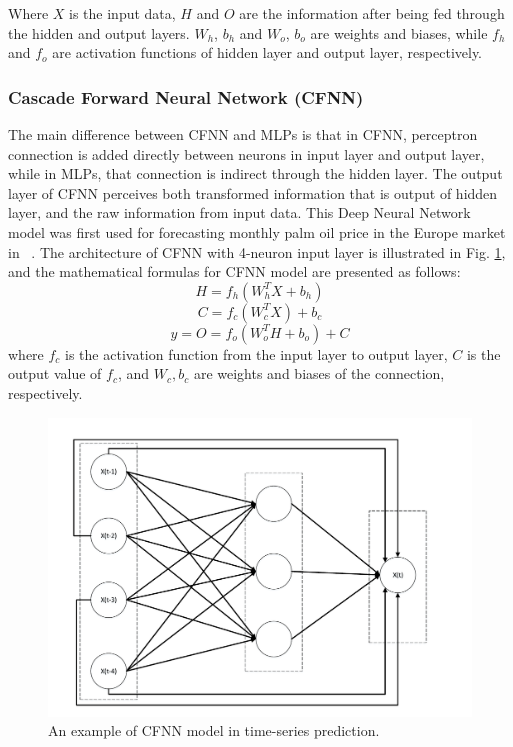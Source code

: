 \documentclass[a4paper,13pt,2p]{report}
\begin{document}
Where $X$ is the input data, $H$ and $O$ are the information after being fed through the hidden and output layers. $W_h$, $b_h$ and $W_o$, $b_o$ are weights and biases, while $f_h$ and $f_o$ are activation functions of hidden layer and output layer, respectively.


\subsubsection{Cascade Forward Neural Network (CFNN)}
\label{model_cfnn}

The main difference between CFNN and MLPs is that in CFNN, perceptron connection is added directly between neurons in input layer and output layer, while in MLPs, that connection is indirect through the hidden layer. The output layer of CFNN perceives both transformed information that is output of hidden layer, and the raw information from input data. This Deep Neural Network model was first used for forecasting monthly palm oil price in the Europe market in ~\cite{warsito2018cascade}. The architecture of CFNN with 4-neuron input layer is illustrated in Fig. \ref{fig_model_cfnn}, and the mathematical formulas for CFNN model are presented as follows:
\begin{equation}\label{eq_cfnn_1}
H = f_h(W_h^TX + b_h)
\end{equation}
\begin{equation}\label{eq_cfnn_2}
C = f_c(W_c^TX) + b_c
\end{equation}
\begin{equation}\label{eq_cfnn_3}
y = O = f_o(W_o^TH + b_o) + C
\end{equation} 
where $f_c$ is the activation function from the input layer to output layer, $C$ is the output value of $f_c$, and $W_c, b_c$ are weights and biases of the connection, respectively.

\begin{figure}[!ht] 
   \centering
   \includegraphics[width=0.75\linewidth]{pdf/model/model_cfnn}
  \caption{An example of CFNN model in time-series prediction.} 
  \label{fig_model_cfnn} 
\end{figure}
\end{document}

